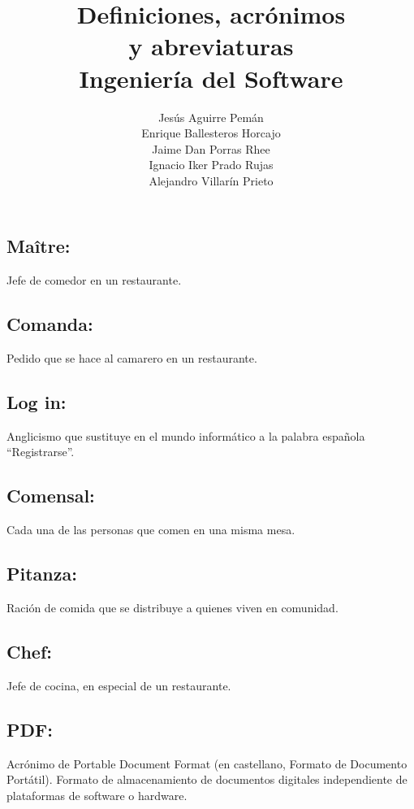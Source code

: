 \documentclass[spanish,a4paper,12pt]{report}	%
\begin{document}
\title{\textbf{\huge{Definiciones, acrónimos \\ 
	y abreviaturas}} \\ \vspace{0.3cm}
	\Large{Ingeniería del Software}}
\author{ Jesús Aguirre Pemán \\
	 Enrique Ballesteros Horcajo \\
	 Jaime Dan Porras Rhee \\
	 Ignacio Iker Prado Rujas \\
	 Alejandro Villarín Prieto }
\date{\Today}
\maketitle

\newpage
\mbox{}
\thispagestyle{empty}						%
\newpage


\tableofcontents 							%

\newpage
\mbox{}
\thispagestyle{empty}						%
\newpage	

\subsection{Maître:} Jefe de comedor en un restaurante. 
\subsection{Comanda:} Pedido que se hace al camarero en un restaurante.
\subsection{Log in:} Anglicismo que sustituye en el mundo informático a la palabra española “Registrarse”.
\subsection{Comensal:} Cada una de las personas que comen en una misma mesa.
\subsection{Pitanza:} Ración de comida que se distribuye a quienes viven en comunidad.
\subsection{Chef:} Jefe de cocina, en especial de un restaurante.
\subsection{PDF:} Acrónimo de Portable Document Format (en castellano, Formato de Documento Portátil). Formato de almacenamiento de documentos digitales independiente de plataformas de software o hardware.
\end{document}
